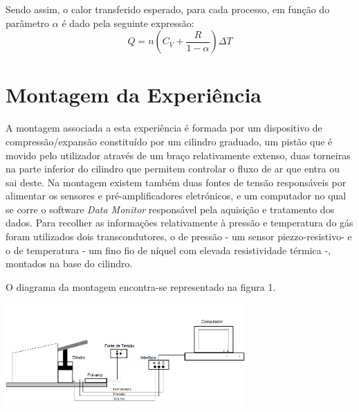 \documentclass[9pt]{extarticle}
\begin{document}
\begin{multicols}{2}
\par Sendo assim, o calor transferido esperado, para cada processo, em função do parâmetro $\alpha$ é  dado pela seguinte expressão:
\begin{equation} \label{Q}
Q = n \left(C_V + \frac{R}{1-\alpha}\right) \Delta T
\end{equation} 

\section{Montagem da Experiência}

\par A montagem associada a esta experiência é formada por um dispositivo de compressão/expansão constituído por um cilindro graduado, um pistão que é movido pelo utilizador através de um braço relativamente extenso, duas torneiras na parte inferior do cilindro que permitem controlar o fluxo de ar que entra ou sai deste. Na montagem existem também duas fontes de tensão responsáveis por alimentar os sensores e pré-amplificadores eletrónicos, e um computador no qual se corre o software \textit{Data Monitor} responsável pela aquisição e tratamento dos dados. Para recolher as informações relativamente à pressão e temperatura do gás foram utilizados dois transcondutores, o de pressão - um sensor piezzo-resistivo- e o de temperatura - um fino fio de níquel com elevada resistividade térmica -, montados na base do cilindro. 

\par O diagrama da montagem encontra-se representado na figura 1.

\hspace{-0.8cm}
\begin{center}
\includegraphics[width=260pt]{diagrama.png}
\begin{center}
\par{}
\end{center}
\end{center}


\end{multicols}
\end{document}
